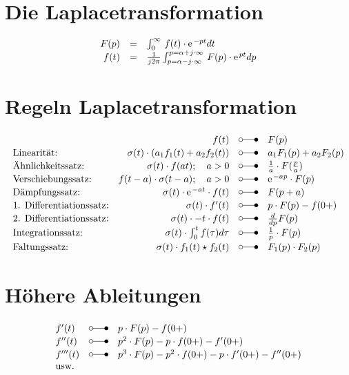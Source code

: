 \section{Die Laplacetransformation}
\begin{align*}
\begin{array}{rcl}
F(p) & = & \int_{0}^{\infty} \, f(t) \cdot \e^{-pt} dt\\ 
f(t) & = & \frac{1}{j 2 \pi} \int_{p=\alpha-j \cdot \infty}^{p=\alpha +j \cdot \infty} \, F(p) \cdot \e^{pt} dp\\ 
\end{array}
\end{align*}

\section{Regeln Laplacetransformation}

\begin{align*}
\begin{array}{lrcl}
	\mbox{} & f(t) & \laplace & F(p)\\
\mbox{Linearität:} & \sigma(t) \cdot (a_1 f_1(t) + a_2 f_2(t)) & \laplace & a_1 F_1(p) + a_2 F_2(p) \\
\mbox{Ähnlichkeitssatz:} & \sigma(t) \cdot f(at); \quad a>0  & \laplace & \frac{1}{a} \cdot F(\frac{p}{a}) \\
\mbox{Verschiebungssatz:} & f(t-a) \cdot \sigma(t-a); \quad a>0  & \laplace & \e^{-ap} \cdot F(p)\\
\mbox{Dämpfungssatz:} & \sigma(t) \cdot \e^{-at} \cdot f(t) & \laplace & F(p+a)\\
\mbox{1. Differentiationssatz:} & \sigma(t) \cdot f'(t) & \laplace & p \cdot F(p) - f(0+)\\
\mbox{2. Differentiationssatz:} & \sigma(t) \cdot -t \cdot f(t) & \laplace & \frac{d}{dp} F(p)\\
\mbox{Integrationssatz:} & \sigma(t) \cdot \int_0^t f(\tau) d \tau & \laplace & \frac{1}{p} \cdot F(p)\\
\mbox{Faltungssatz:} & \sigma(t) \cdot f_1(t) \star f_2(t) & \laplace & F_1(p) \cdot F_2(p)
\end{array}
\end{align*}

\section{Höhere Ableitungen}
\begin{align*}
\begin{array}{lcl}
f'(t) & \laplace & p \cdot F(p) - f(0+)\\
f''(t) & \laplace & p^2 \cdot F(p) -p \cdot f(0+) - f'(0+)\\
f'''(t) & \laplace & p^3 \cdot F(p) - p^2 \cdot f(0+) - p \cdot f'(0+) - f''(0+)\\
\mbox{usw.} & {} & {}
\end{array}
\end{align*}

